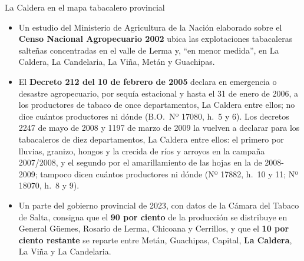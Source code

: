 \begin{ficha}{La Caldera en el mapa tabacalero provincial}
\begin{itemize}[leftmargin=*,nosep]
\item Un estudio del Ministerio de Agricultura de la Nación elaborado sobre el \textbf{Censo Nacional Agropecuario 2002} ubica las explotaciones tabacaleras salteñas concentradas en el valle de Lerma y, ``en menor medida'', en La Caldera, La Candelaria, La Viña, Metán y Guachipas.
\item El \textbf{Decreto 212 del 10 de febrero de 2005} declara en emergencia o desastre agropecuario, por sequía estacional y hasta el 31 de enero de 2006, a los productores de tabaco de once departamentos, La Caldera entre ellos; no dice cuántos productores ni dónde (B.O.\ Nº 17080, h.\ 5 y 6). Los decretos 2247 de mayo de 2008 y 1197 de marzo de 2009 la vuelven a declarar para los tabacaleros de diez departamentos, La Caldera entre ellos: el primero por lluvias, granizo, hongos y la crecida de ríos y arroyos en la campaña 2007/2008, y el segundo por el amarillamiento de las hojas en la de 2008-2009; tampoco dicen cuántos productores ni dónde (Nº 17882, h.\ 10 y 11; Nº 18070, h.\ 8 y 9).
\item Un parte del gobierno provincial de 2023, con datos de la Cámara del Tabaco de Salta, consigna que el \textbf{90 por ciento} de la producción se distribuye en General Güemes, Rosario de Lerma, Chicoana y Cerrillos, y que el \textbf{10 por ciento restante} se reparte entre Metán, Guachipas, Capital, \textbf{La Caldera}, La Viña y La Candelaria.
\end{itemize}
\end{ficha}

